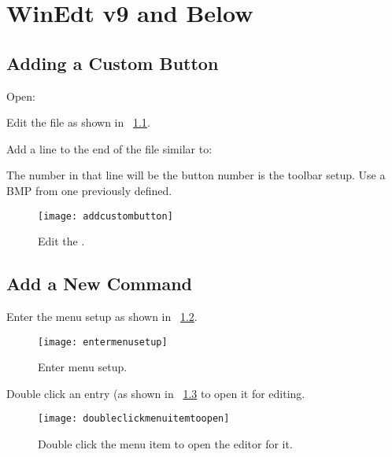 \chapter{WinEdt v9 and Below}
\section{Adding a Custom Button}

\begin{numberedlist}
	\item Open: 
	
	\item Edit the  file as shown in \figurename~\ref{fig:addcustombutton}.
	
	\item Add a line to the end of the file similar to:
	\begin{plainlist}
		\item {}
		\item {}
		\item {}
		\item {}
	\end{plainlist}
\end{numberedlist}
The number in that line will be the button number is the toolbar setup.
Use a BMP from one previously defined.
\begin{figure}
	\centering
	\texttt{[image: addcustombutton]}
	\caption[Edit the ]{Edit the .}
	\label{fig:addcustombutton}
\end{figure}



\section{Add a New Command}
Enter the menu setup as shown in \figurename~\ref{fig:entermenusetup}.
\begin{figure}
	\centering
	\texttt{[image: entermenusetup]}
	\caption[Enter menu setup]{Enter menu setup.}
	\label{fig:entermenusetup}
\end{figure}

Double click an entry (as shown in \figurename~\ref{fig:doubleclickmenuitemtoopen} to open it for editing.
\begin{figure}
	\centering
	\texttt{[image: doubleclickmenuitemtoopen]}
	\caption[Double click the menu item to open the editor for it]{Double click the menu item to open the editor for it.}
	\label{fig:doubleclickmenuitemtoopen}
\end{figure}

